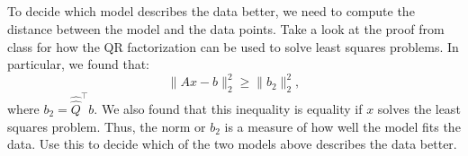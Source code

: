 \documentclass{article}%
\begin{document}
\subsection{} To decide which model describes the data better, we need to
  compute the distance between the model and the data points. Take a
  look at the proof from class for how  the QR  factorization can be
  used to solve least squares  problems. In  particular, we found
  that:
  $$
  \|  A  x  -    b\|_2^2 \ge \|  b_2\|_2^2,
  $$ where $  b_2 =  {\hat{\hat Q}}^\top  b$. We also
  found that this inequality is equality if $  x$ solves
  the least squares problem. Thus, the norm or $  b_2$ is a
  measure of how well the model fits the data. Use this to decide
  which of the two models above describes the data better.
  
    
    
\end{document}
